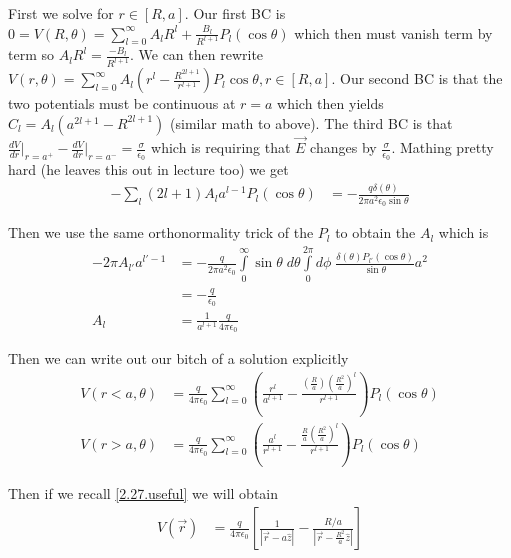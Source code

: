 \documentclass[10pt]{report}
\newcommand{\rd}[2]{\frac{d#1}{d#2}}
\newcommand{\abs}[1]{\left|#1\right|}
\begin{document}
First we solve for $r \in [R,a]$. Our first BC is $0 = V(R,\theta) = \sum_{l=0}^{\infty}A_lR^l + \frac{B_l}{R^{l+1}}P_l(\cos\theta)$ which then must vanish term by term so $A_lR^l = \frac{-B_l}{R^{l+1}}$. We can then rewrite $V(r,\theta) = \sum_{l=0}^{\infty}A_l\left( r^l - \frac{R^{2l+1}}{r^{l+1}} \right)P_l\cos\theta, r \in [R,a]$. Our second BC is that the two potentials must be continuous at $r=a$ which then yields $C_l = A_l\left( a^{2l+1} - R^{2l+1} \right)$ (similar math to above). The third BC is that $\rd{V}{r}\Big|_{r = a^+} - \rd{V}{r}\Big|_{r = a^-} = \frac{\sigma}{\epsilon_0}$ which is requiring that $\vec{E}$ changes by $\frac{\sigma}{\epsilon_0}$. Mathing pretty hard (he leaves this out in lecture too) we get 
\begin{align}
    -\sum_{l}^{}(2l+1)A_la^{l-1}P_l(\cos\theta) &= -\frac{q\delta(\theta)}{2\pi a^2\epsilon_0\sin\theta}
\end{align}

Then we use the same orthonormality trick of the $P_l$ to obtain the $A_l$ which is
\begin{align}
    -2\pi A_{l'}a^{l' - 1} &= -\frac{q}{2\pi a^2\epsilon_0} \displaystyle\int\limits_{0}^{\infty}\sin\theta\;d\theta\displaystyle\int\limits_{0}^{2\pi}d\phi\;\frac{\delta(\theta)P_{l'}(\cos\theta)}{\sin\theta}a^2\\
    &= -\frac{q}{\epsilon_0}\\
    A_l &= \frac{1}{a^{l+1}}\frac{q}{4\pi\epsilon_0}
\end{align}

Then we can write out our bitch of a solution explicitly
\begin{align}
    V(r < a, \theta) &= \frac{q}{4\pi\epsilon_0}\sum_{l=0}^{\infty}\left( \frac{r^l}{a^{l+1}} - \frac{\left( \frac{R}{a} \right)\left( \frac{R^2}{a} \right)^l}{r^{l+1}} \right)P_l(\cos\theta)\\
    V(r > a, \theta) &= \frac{q}{4\pi\epsilon_0}\sum_{l=0}^{\infty}\left( \frac{a^l}{r^{l+1}} - \frac{\frac{R}{a}\left( \frac{R^2}{a} \right)^l}{r^{l+1}} \right)P_l(\cos\theta)
\end{align}

Then if we recall \eqref{2.27.useful} we will obtain
\begin{align}
    V(\vec{r}) &= \frac{q}{4\pi\epsilon_0}\left[ \frac{1}{\abs{\vec{r} - a\hat{z}}} - \frac{R/a}{\abs{\vec{r} - \frac{R^2}{a}\hat{z}}} \right]
\end{align}
\end{document}
